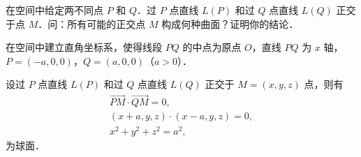 
在空间中给定两不同点 $P$ 和 $Q$．过 $P$ 点直线 $L(P)$ 和过 $Q$ 点直线 $L(Q)$ 正交于点 $M$．问：所有可能的正交点 $M$ 构成何种曲面？证明你的结论．
\begin{solution}
在空间中建立直角坐标系，使得线段 $PQ$ 的中点为原点 $O$，直线 $PQ$ 为 $x$ 轴，$P=(-a,0,0)$，$Q=(a,0,0)$（$a>0$）．

设过 $P$ 点直线 $L(P)$ 和过 $Q$ 点直线 $L(Q)$ 正交于 $M=(x,y,z)$ 点，则有
\begin{gather*}
\overrightarrow{PM}\cdot\overrightarrow{QM}=0,\\
(x+a,y,z)\cdot(x-a,y,z)=0,\\
x^{2}+y^{2}+z^{2}=a^{2},
\end{gather*}
为球面．
\end{solution}

